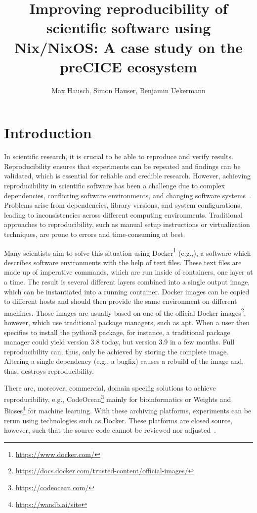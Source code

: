 \documentclass{eceasst}
\title{Improving reproducibility of scientific software using Nix/NixOS: A case study on the preCICE ecosystem}
\author{
Max Hausch\autref{1}\autref{*},
Simon Hauser\autref{1}\autref{*},
Benjamin Uekermann\autref{1}}
\institute{
\autlabel{1} Institute for Parallel and Distributed Systems\\ University of Stuttgart\\ \email{benjamin.uekermann@ipvs.uni-stuttgart.de}\\
\autlabel{*} These authors contributed equally to this work.}
\begin{document}
\maketitle

\section{Introduction}

In scientific research, it is crucial to be able to reproduce and verify results.
Reproducibility ensures that experiments can be repeated and findings can be validated, which is essential for reliable and credible research.
However, achieving reproducibility in scientific software has been a challenge due to complex dependencies, conflicting software environments, and changing software systems~\cite{Dalle_2012}.
Problems arise from dependencies, library versions, and system configurations, leading to inconsistencies across different computing environments.
Traditional approaches to reproducibility, such as manual setup instructions or virtualization techniques, are prone to errors and time-consuming at best.

Many scientists aim to solve this situation using Docker\footnote{\url{https://www.docker.com/}} (e.g.,\cite{koch2023sustainable}),
a software which describes software environments with the help of text files.
These text files are made up of imperative commands, which are run inside of containers, one layer at a time.
The result is several different layers combined into a single output image, which can be instantiated into a running container.
Docker images can be copied to different hosts and should then provide the same environment on different machines.
Those images are usually based on one of the official Docker images\footnote{\url{https://docs.docker.com/trusted-content/official-images/}}, however, which use traditional package managers, such as apt.
When a user then specifies to install the python3 package, for instance, a traditional package manager could yield version 3.8 today, but version 3.9 in a few months.
Full reproducibility can, thus, only be achieved by storing the complete image. Altering a single dependency (e.g., a bugfix) causes a rebuild of the image and, thus, destroys reproducibility.

There are, moreover, commercial, domain specifig solutions to achieve reproducibility, e.g., CodeOcean\footnote{\url{https://codeocean.com/}} mainly for bioinformatics or Weights and Biases\footnote{\url{https://wandb.ai/site}} for machine learning.
With these archiving platforms, experiments can be rerun using technologies such as Docker.
These platforms are closed source, however, such that the source code cannot be reviewed nor adjusted~\cite{koch2023sustainable}.
\end{document}
